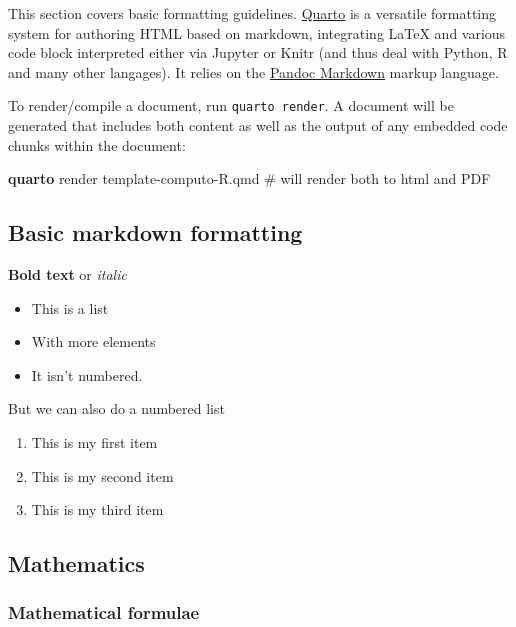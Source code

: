 \documentclass[
  11pt,
  a4paper,
]{article}
\newenvironment{Shaded}{}{}
\newcommand{\CommentTok}[1]{\textcolor[rgb]{0.42,0.45,0.49}{#1}}
\newcommand{\ExtensionTok}[1]{\textcolor[rgb]{0.84,0.23,0.29}{\textbf{#1}}}
\newcommand{\NormalTok}[1]{\textcolor[rgb]{0.14,0.16,0.18}{#1}}
\providecommand{\tightlist}{%
  \setlength{\itemsep}{0pt}\setlength{\parskip}{0pt}}\usepackage{longtable,booktabs,array}
\theoremstyle{plain}
\theoremstyle{remark}
\begin{document}
This section covers basic formatting guidelines.
\href{https://quarto.org/}{Quarto} is a versatile formatting system for
authoring HTML based on markdown, integrating LaTeX and various code
block interpreted either via Jupyter or Knitr (and thus deal with
Python, R and many other langages). It relies on the
\href{https://rmarkdown.rstudio.com/authoring_pandoc_markdown.html}{Pandoc
Markdown} markup language.

To render/compile a document, run \texttt{quarto\ render}. A document
will be generated that includes both content as well as the output of
any embedded code chunks within the document:

\begin{Shaded}
\begin{Highlighting}[]
\ExtensionTok{quarto}\NormalTok{ render template{-}computo{-}R.qmd }\CommentTok{\# will render both to html and PDF}
\end{Highlighting}
\end{Shaded}

\hypertarget{basic-markdown-formatting}{%
\subsection{Basic markdown formatting}\label{basic-markdown-formatting}}

\textbf{Bold text} or \emph{italic}

\begin{itemize}
\tightlist
\item
  This is a list
\item
  With more elements
\item
  It isn't numbered.
\end{itemize}

But we can also do a numbered list

\begin{enumerate}
\def\labelenumi{\arabic{enumi}.}
\tightlist
\item
  This is my first item
\item
  This is my second item
\item
  This is my third item
\end{enumerate}

\hypertarget{mathematics}{%
\subsection{Mathematics}\label{mathematics}}

\hypertarget{mathematical-formulae}{%
\subsubsection{Mathematical formulae}\label{mathematical-formulae}}
\end{document}
